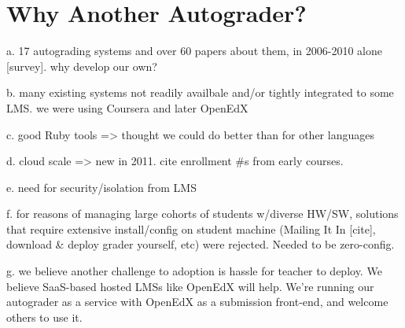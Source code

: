 \section{Why Another Autograder?}



a.	17 autograding systems and over 60  papers  about them, in 2006-2010 alone [survey]. why develop our own? 

b.	many existing systems not readily availbale and/or tightly integrated to some LMS. we were using Coursera and later OpenEdX

c.	good Ruby tools => thought we could do better than for other languages

d.	cloud scale => new in 2011. cite enrollment #s from early courses.

e.	need for security/isolation from LMS

f.	for reasons of managing large cohorts of students w/diverse HW/SW, solutions that require extensive install/config on student machine (Mailing It In [cite], download & deploy grader yourself, etc) were rejected. Needed to be zero-config.

g.	we believe another challenge to adoption is hassle for teacher to deploy. We believe SaaS-based hosted LMSs like OpenEdX will help. We're running our autograder as a service with OpenEdX as a submission front-end, and welcome others to use it.



